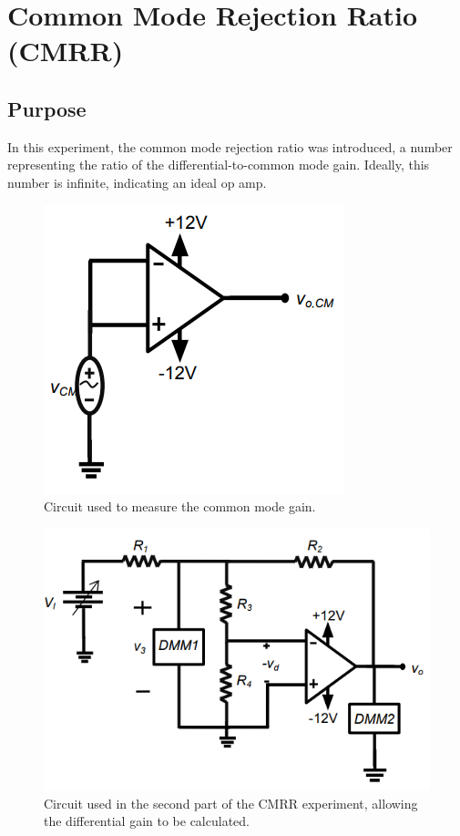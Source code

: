 \documentclass{report}
\begin{document}
\section{Common Mode Rejection Ratio (CMRR)}

\subsection{Purpose}
In this experiment, the common mode rejection ratio was introduced, a number representing the ratio of the differential-to-common mode gain. Ideally, this number is infinite, indicating an ideal op amp.


\begin{figure}[h]
	\centering
	\includegraphics[width=0.4\linewidth]{exp4a}
	\caption{Circuit used to measure the common mode gain.}
	\label{fig:exp4a}
\end{figure}
\begin{figure}[h]
	\centering
	\includegraphics[width=0.5\linewidth]{exp4b}
	\caption{Circuit used in the second part of the CMRR experiment, allowing the differential gain to be calculated.}
	\label{fig:exp4b}
\end{figure}
\end{document}
